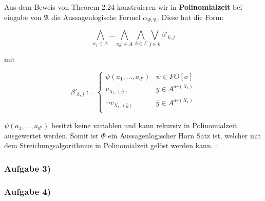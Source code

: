 \documentclass[12pt]{article}
\begin{document}
Aus dem Beweis von Theorem 2.24 konstruieren wir in \textbf{Polinomialzeit} bei eingabe von $\mathfrak{A}$ die Aussagenlogische Formel $\alpha_{\Phi,\mathfrak{A}}$. Diese hat die Form:

\[ \bigwedge_{a_1\in A}... \bigwedge_{a_d'\in A} \bigwedge_{k\in \Gamma} \bigvee_{j\in k} \beta'_{k,j} \] 

mit 

\[ \beta'_{k,j} := 
  \begin{cases}
    \psi(a_1,...,a_{d'}) & \psi\in FO[\sigma]\\
    v_{X_i,(\bar y)} & \bar y \in A^{ar(X_i)} \\
    \neg v_{X_i,(\bar y)} & \bar y \in A^{ar(X_i)} \\
  \end{cases}
\] 

$ \psi(a_1,...,a_{d'}) $ besitzt keine variablen und kann rekursiv in Polinomialzeit ausgewertet werden.
Somit ist $\Phi$ ein Aussagenlogischer Horn Satz ist, welcher mit dem Streichungsalgorithmus in Polinomialzeit gelöst werden kann.
$\square$

\subsubsection*{Aufgabe 3)}
\subsubsection*{Aufgabe 4)}
\end{document}
